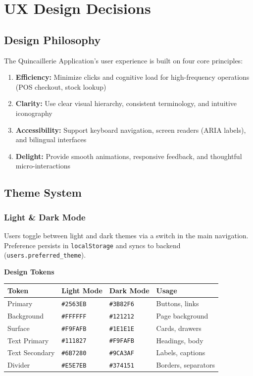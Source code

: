\section{UX Design Decisions}

\subsection{Design Philosophy}

The Quincaillerie Application's user experience is built on four core principles:

\begin{enumerate}
    \item \textbf{Efficiency:} Minimize clicks and cognitive load for high-frequency operations (POS checkout, stock lookup)
    \item \textbf{Clarity:} Use clear visual hierarchy, consistent terminology, and intuitive iconography
    \item \textbf{Accessibility:} Support keyboard navigation, screen readers (ARIA labels), and bilingual interfaces
    \item \textbf{Delight:} Provide smooth animations, responsive feedback, and thoughtful micro-interactions
\end{enumerate}

\subsection{Theme System}

\subsubsection{Light \& Dark Mode}

Users toggle between light and dark themes via a switch in the main navigation. Preference persists in \texttt{localStorage} and syncs to backend (\texttt{users.preferred\_theme}).

\textbf{Design Tokens}

\begin{center}
\begin{tabular}{@{}llll@{}}
\toprule
\textbf{Token} & \textbf{Light Mode} & \textbf{Dark Mode} & \textbf{Usage} \\
\midrule
Primary & \texttt{\#2563EB} & \texttt{\#3B82F6} & Buttons, links \\
Background & \texttt{\#FFFFFF} & \texttt{\#121212} & Page background \\
Surface & \texttt{\#F9FAFB} & \texttt{\#1E1E1E} & Cards, drawers \\
Text Primary & \texttt{\#111827} & \texttt{\#F9FAFB} & Headings, body \\
Text Secondary & \texttt{\#6B7280} & \texttt{\#9CA3AF} & Labels, captions \\
Divider & \texttt{\#E5E7EB} & \texttt{\#374151} & Borders, separators \\
\bottomrule
\end{tabular}
\end{center}

